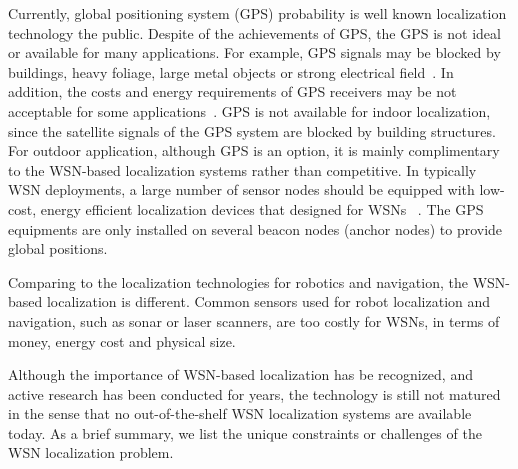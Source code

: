 Currently, global positioning system (GPS) probability is well known localization technology the public. Despite of the achievements of GPS, the GPS is not ideal or available for many applications. For example, GPS signals may be blocked by buildings, heavy foliage, large metal objects or strong electrical field~\cite{NiculescuAPSAoAInfocom03}. In addition, the costs and energy requirements of GPS receivers may be not acceptable for some applications~\cite{PawariLocatingTheNodes05}.
    GPS is not available for indoor localization, since the satellite signals of the GPS system are blocked by building structures.   For outdoor application, although GPS is an option, it is mainly complimentary to the WSN-based localization systems rather than competitive. In typically WSN deployments, a large number of sensor nodes should be equipped with low-cost, energy efficient localization devices that designed for WSNs ~\cite{White_Paper_nanoNET-2,AetherExecutiveSummary96}. The GPS equipments are only installed on several beacon nodes (anchor nodes) to provide global positions.


Comparing to the localization technologies for robotics and navigation, the WSN-based localization is different. Common sensors used for robot localization and navigation, such as sonar or laser scanners, are too costly for WSNs, in terms of money, energy cost and physical size.


Although the importance of WSN-based localization has be recognized, and active research has been conducted for years, the technology is still not matured in the sense that no out-of-the-shelf WSN localization systems are available today. As a brief summary, we list the unique constraints or challenges of the WSN localization problem.

